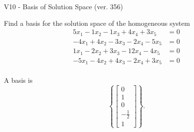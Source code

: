 \begin{exercise}
  \begin{exerciseTitle}V10 - Basis of Solution Space (ver. 356)\end{exerciseTitle}
  \begin{exerciseStatement}
    Find a basis for the solution space of the homogeneous system 
\begin{align*}
 5 x_ 1 -1 x_ 2 -1 x_ 3 + 4 x_ 4 + 3 x_ 5 &= 0  \\ 
  -4 x_ 1 + 4 x_ 2 -3 x_ 3 -2 x_ 4 -5 x_ 5 &= 0  \\ 
  1 x_ 1 -2 x_ 2 + 3 x_ 3 -12 x_ 4 -4 x_ 5 &= 0  \\ 
  -5 x_ 1 -4 x_ 2 + 4 x_ 3 -2 x_ 4 + 3 x_ 5 &= 0  \\ 
 \end{align*}


 
  \end{exerciseStatement}

  \begin{exerciseAnswer}
   A basis is   
\[\left\{\left[\begin{array}{c}
0 \\
1 \\
0 \\
-\frac{1}{2} \\
1
\end{array}\right]\right\}.\]

  


  \end{exerciseAnswer}
\end{exercise}